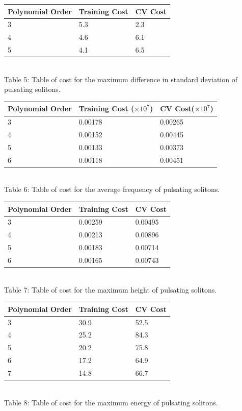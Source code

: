 \documentclass[a4paper,12pt]{report}
\begin{document}
\begin{center}
\begin{tabular}{|l|l|l|}
\hline
Polynomial Order & Training Cost & CV Cost\\
\hline
3&5.3&2.3\\
4&4.6&6.1\\
5&4.1&6.5\\
\hline
\end{tabular}
\\Table 5: Table of cost for the maximum difference in standard deviation of pulsating solitons.
\end{center}
\begin{center}
\begin{tabular}{|l|l|l|}
\hline
Polynomial Order & Training Cost ($\times 10^7$) & CV Cost($\times 10^7$)\\
\hline
3&0.00178&0.00265\\
4&0.00152&0.00445\\
5&0.00133&0.00373\\
6&0.00118&0.00451\\
\hline
\end{tabular}
\\Table 6: Table of cost for the average frequency of pulsating solitons.
\end{center}
\begin{center}
\begin{tabular}{|l|l|l|}
\hline
Polynomial Order & Training Cost & CV Cost\\
\hline
3&0.00259&0.00495\\
4&0.00213&0.00896\\
5&0.00183&0.00714\\
6&0.00165&0.00743\\
\hline
\end{tabular}
\\Table 7: Table of cost for the maximum height of pulsating solitons.
\end{center}
\begin{center}
\begin{tabular}{|l|l|l|}
\hline
Polynomial Order & Training Cost  & CV Cost\\
\hline
3&30.9&52.5\\
4&25.2&84.3\\
5&20.2&75.8\\
6&17.2&64.9\\
7&14.8&66.7\\
\hline
\end{tabular}
\\Table 8: Table of cost for the maximum energy of pulsating solitons.
\end{center}
\end{document}
